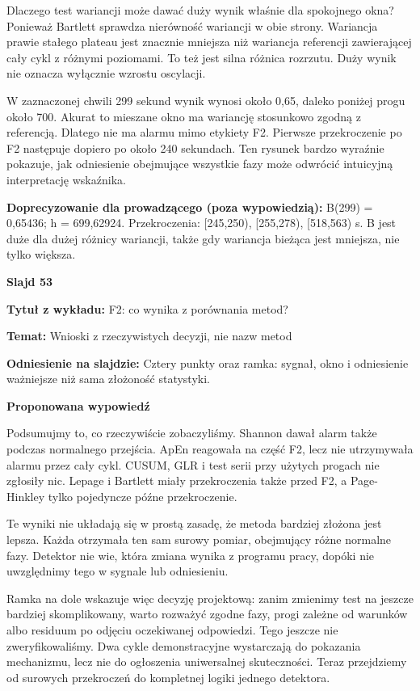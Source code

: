 \documentclass[a4paper,11pt]{article}
\newcommand{\NumerSlajdu}{1}
\newcommand{\Komentarz}[3]{%
  \gdef\NumerSlajdu{#1}%
  {\Large\bfseries Slajd #1\par}\smallskip
  \textbf{Tytuł z wykładu:} #2\par
  \textbf{Temat:} #3\par\medskip
}
\begin{document}
Dlaczego test wariancji może dawać duży wynik właśnie dla spokojnego okna? Ponieważ Bartlett sprawdza nierówność wariancji w obie strony. Wariancja prawie stałego plateau jest znacznie mniejsza niż wariancja referencji zawierającej cały cykl z różnymi poziomami. To też jest silna różnica rozrzutu. Duży wynik nie oznacza wyłącznie wzrostu oscylacji.

W zaznaczonej chwili 299 sekund wynik wynosi około 0,65, daleko poniżej progu około 700. Akurat to mieszane okno ma wariancję stosunkowo zgodną z referencją. Dlatego nie ma alarmu mimo etykiety F2. Pierwsze przekroczenie po F2 następuje dopiero po około 240 sekundach. Ten rysunek bardzo wyraźnie pokazuje, jak odniesienie obejmujące wszystkie fazy może odwrócić intuicyjną interpretację wskaźnika.

{\small\color{black!65}\textbf{Doprecyzowanie dla prowadzącego (poza wypowiedzią):} B(299) = 0,65436; h = 699,62924. Przekroczenia: [245,250), [255,278), [518,563) s. B jest duże dla dużej różnicy wariancji, także gdy wariancja bieżąca jest mniejsza, nie tylko większa.\par}
\clearpage

\Komentarz{53}{F2: co wynika z porównania metod?}{Wnioski z rzeczywistych decyzji, nie nazw metod}
{\small\color{black!65}\textbf{Odniesienie na slajdzie:} Cztery punkty oraz ramka: sygnał, okno i odniesienie ważniejsze niż sama złożoność statystyki.\par}
\medskip
\textbf{Proponowana wypowiedź}\par
Podsumujmy to, co rzeczywiście zobaczyliśmy. Shannon dawał alarm także podczas normalnego przejścia. ApEn reagowała na część F2, lecz nie utrzymywała alarmu przez cały cykl. CUSUM, GLR i test serii przy użytych progach nie zgłosiły nic. Lepage i Bartlett miały przekroczenia także przed F2, a Page-Hinkley tylko pojedyncze późne przekroczenie.

Te wyniki nie układają się w prostą zasadę, że metoda bardziej złożona jest lepsza. Każda otrzymała ten sam surowy pomiar, obejmujący różne normalne fazy. Detektor nie wie, która zmiana wynika z programu pracy, dopóki nie uwzględnimy tego w sygnale lub odniesieniu.

Ramka na dole wskazuje więc decyzję projektową: zanim zmienimy test na jeszcze bardziej skomplikowany, warto rozważyć zgodne fazy, progi zależne od warunków albo residuum po odjęciu oczekiwanej odpowiedzi. Tego jeszcze nie zweryfikowaliśmy. Dwa cykle demonstracyjne wystarczają do pokazania mechanizmu, lecz nie do ogłoszenia uniwersalnej skuteczności. Teraz przejdziemy od surowych przekroczeń do kompletnej logiki jednego detektora.
\clearpage
\end{document}
